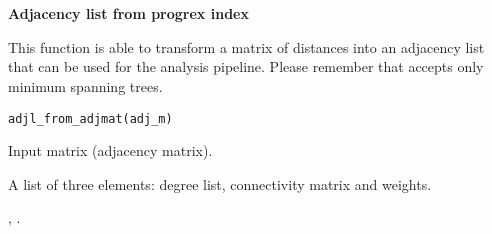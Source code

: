 \documentclass[letterpaper]{book}
\begin{document}
\chapter*{}
\begin{center}
{\textbf{\huge Adjacency list from progrex index}}
\par\bigskip{\large \today}
\end{center}
%
\begin{Description}\relax
This function is able to transform a matrix of distances into an adjacency list that can be used for the analysis pipeline.
Please remember that  accepts only minimum spanning trees.
\end{Description}
%
\begin{Usage}
\begin{verbatim}
adjl_from_adjmat(adj_m)
\end{verbatim}
\end{Usage}
%
\begin{Arguments}
\begin{ldescription}
\item[\code{adj\_m}] Input matrix (adjacency matrix).
\end{ldescription}
\end{Arguments}
%
\begin{Value}
A list of three elements: degree list, connectivity matrix and weights.
\end{Value}
%
\begin{SeeAlso}\relax
{}, .
\end{SeeAlso}
\end{document}
